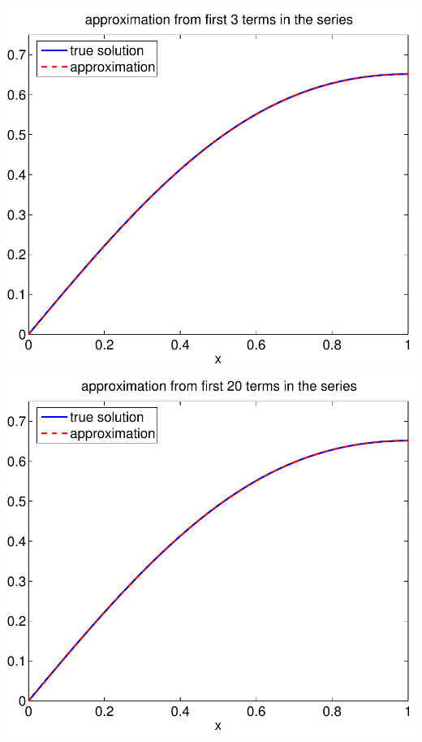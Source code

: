 {\begin{solution}
\begin{enumerate}
\begin{center}
   \includegraphics[scale=0.4]{bvps2_3}\quad
   \includegraphics[scale=0.4]{bvps2_20}
\end{center}



\end{enumerate}
\end{solution}}
